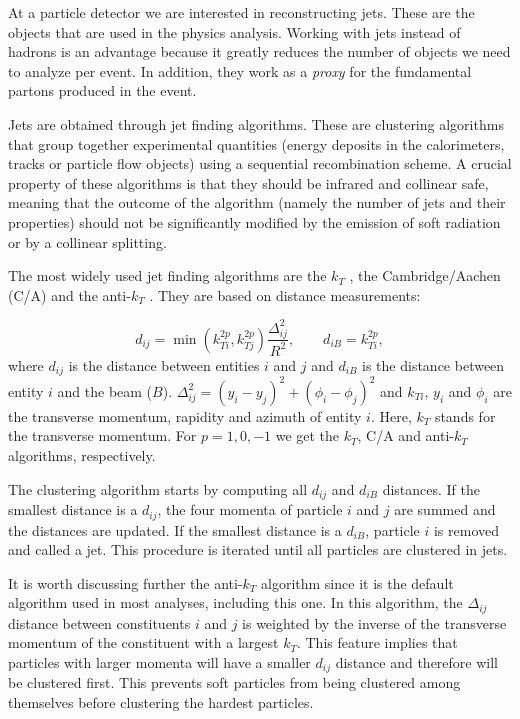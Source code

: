 At a particle detector we are interested in reconstructing jets. These are the objects that are used in the physics analysis. Working with jets instead of hadrons is an advantage because it greatly reduces the number of objects we need to analyze per event. In addition, they work as a \textit{proxy} for the fundamental partons produced in the event.

Jets are obtained through jet finding algorithms. These are clustering algorithms that group together experimental quantities (energy deposits in the calorimeters, tracks or particle flow objects) using a sequential recombination scheme. A crucial property of these algorithms is that they should be infrared and collinear safe, meaning that the outcome of the algorithm (namely the number of jets and their properties) should not be significantly
modified by the emission of soft radiation or by a collinear splitting.

The most widely used jet finding algorithms are the $k_T$ \cite{kt}, the Cambridge/Aachen (C/A) \cite{CA} and the anti-$k_T$ \cite{anti-kt}. They are based on distance measurements:

\begin{equation}
d_{ij}=\min(k_{Ti}^{2p},k_{Tj}^{2p})\frac{\Delta_{ij}^2}{R^2}, \qquad
d_{iB}=k_{Ti}^{2p},
\end{equation}
where $d_{ij}$ is the distance between entities $i$ and $j$ and $d_{iB}$ is the distance between entity $i$ and the beam ($B$). $\Delta_{ij}^2=(y_i-y_j)^2+(\phi_i-\phi_j)^2$ and $k_{Ti}$, $y_i$ and $\phi_i$ are the transverse momentum, rapidity and azimuth of entity $i$. Here, $k_{T}$ stands for the transverse momentum. For $p=1,0,-1$ we get the $k_T$, C/A and anti-$k_T$ algorithms, respectively.

The clustering algorithm starts by computing all $d_{ij}$ and $d_{iB}$ distances. If the smallest distance is a $d_{ij}$, the four momenta of particle $i$ and $j$ are summed and the distances are updated. If the smallest distance is a $d_{iB}$, particle $i$ is removed and called a jet. This procedure is iterated until all particles are clustered in jets.

It is worth discussing further the anti-$k_T$ algorithm since it is the default algorithm used in most analyses, including this one. In this algorithm, the $\Delta_{ij}$ distance between constituents $i$ and $j$ is weighted by the inverse of the transverse momentum of the constituent with a largest $k_T$. This feature implies that particles with larger momenta will have a smaller $d_{ij}$ distance and therefore will be clustered first. This prevents soft particles from being clustered among themselves before clustering the hardest particles.


